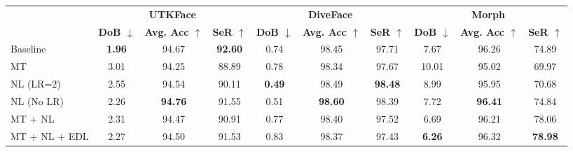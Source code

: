 \documentclass[runningheads]{llncs}
\begin{document}
\begin{table}
{\begin{tabular}{lccccccccc} 
\toprule
                     & \multicolumn{3}{c}{\textbf{UTKFace}}                                               & \multicolumn{3}{c}{\textbf{DiveFace}}                                              & \multicolumn{3}{c}{\textbf{Morph}}                                                  \\ 
\cmidrule(l){2-10}
                     & \textbf{DoB $\downarrow$} & \textbf{Avg. Acc $\uparrow$} & \textbf{SeR $\uparrow$} & \textbf{DoB $\downarrow$} & \textbf{Avg. Acc $\uparrow$} & \textbf{SeR $\uparrow$} & \textbf{DoB $\downarrow$} & \textbf{Avg. Acc $\uparrow$} & \textbf{SeR $\uparrow$}  \\ 
\midrule
Baseline             & \textbf{1.96}                      & 94.67                        & \textbf{92.60}                   & 0.74                      & 98.45                        & 97.71                   & 7.67                      & 96.26                        & 74.89                    \\
MT                   & 3.01                      & 94.25                        & 88.89                   & 0.78                      & 98.34                        & 97.67                   & 10.01                     & 95.02                        & 69.97                    \\
NL (LR=2)            & 2.55                      & 94.54                        & 90.11                   & \textbf{0.49}             & 98.49                        & \textbf{98.48}          & 8.99                      & 95.95                        & 70.68                    \\
NL (No LR)           & 2.26                      & \textbf{94.76}                        & 91.55                   & 0.51                      & \textbf{98.60}               & 98.39                   & 7.72                      & \textbf{96.41}               & 74.84                    \\
MT + NL              & 2.31                      & 94.47                        & 90.91                   & 0.77                      & 98.40                        & 97.52                   & 6.69                      & 96.21                        & 78.06                    \\
MT + NL + EDL        & 2.27                      & 94.50                        & 91.53                   & 0.83                      & 98.37                        & 97.43                   & \textbf{6.26}             & 96.32                        & \textbf{78.98}           \\

\end{tabular}}
\end{table}
\end{document}
